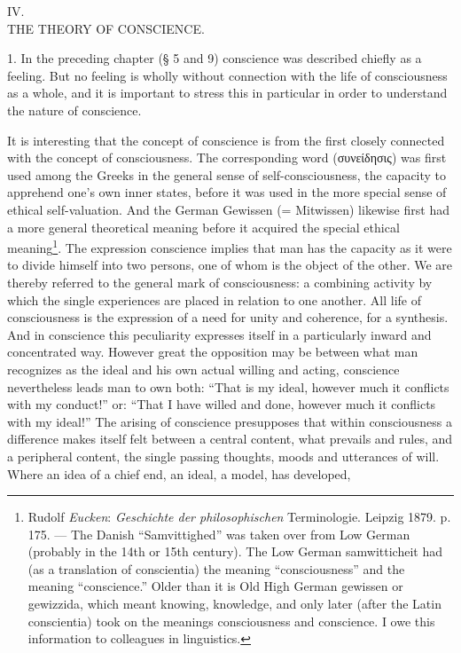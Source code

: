 \documentclass[12pt,a4paper,openany]{book}
\newcommand{\opage}[1]{\marginnote{\footnotesize\textit{[#1]}}}
\newcounter{etikch}
\newcommand{\chapterhead}[2]{\stepcounter{etikch}\bigskip\begin{center}\pdfbookmark[1]{#1 #2}{etikch.\arabic{etikch}}#1\\[3pt]{\large #2}\end{center}\medskip}
\begin{document}
\opage{79}\chapterhead{IV.}{THE THEORY OF CONSCIENCE.}

1. In the preceding chapter (§ 5 and 9) conscience was described chiefly as a feeling. But no feeling
is wholly without connection with the life of consciousness as a whole, and it is important to stress
this in particular in order to understand the nature of conscience.

It is interesting that the concept of conscience is from the first closely connected with the concept
of consciousness. The corresponding word (συνείδησις) was first used among the Greeks in the general
sense of self-consciousness, the capacity to apprehend one's own inner states, before it was used in
the more special sense of ethical self-valuation. And the German Gewissen (= Mitwissen) likewise first
had a more general theoretical meaning before it acquired the special ethical
meaning\footnote[1]{Rudolf \emph{Eucken}: \textit{Geschichte der philosophischen} Terminologie.
Leipzig 1879. p. 175. --- The Danish ``Samvittighed'' was taken over from Low German (probably in the
14th or 15th century). The Low German samwitticheit had (as a translation of conscientia) the meaning
``consciousness'' and the meaning ``conscience.'' Older than it is Old High German gewissen or
gewizzida, which meant knowing, knowledge, and only later (after the Latin conscientia) took on the
meanings consciousness and conscience. I owe this information to colleagues in linguistics.}. The
expression conscience implies that man has the capacity as it were to divide himself into two persons,
one of whom is the object of the other. We are thereby referred to the general mark of consciousness:
a combining activity by which the single experiences are placed in relation to one another. All life
of consciousness is the expression of a need for unity and coherence, for a synthesis. And in
conscience this peculiarity expresses itself in a particularly inward and concentrated way. However
great the opposition may be between what man recognizes as the ideal and his own actual
\opage{80}willing and acting, conscience nevertheless leads man to own both: ``That is my ideal, however much
it conflicts with my conduct!'' or: ``That I have willed and done, however much it conflicts with my
ideal!'' The arising of conscience presupposes that within consciousness a difference makes itself
felt between a central content, what prevails and rules, and a peripheral content, the single passing
thoughts, moods and utterances of will. Where an idea of a chief end, an ideal, a model, has developed,
\end{document}

